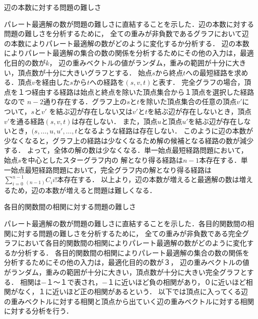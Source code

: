 \documentclass[12pt]{optlab-bachelor}
\begin{document}
\begin{description}
  \item[辺の本数に対する問題の難しさ]
\end{description}

パレート最適解の数が問題の難しさに直結することを示した．辺の本数に対する問題の難しさを分析するために，
全ての重みが非負数であるグラフにおいて辺の本数によりパレート最適解の数がどのように変化するか分析する．
辺の本数によりパレート最適解の集合の数の関係を分析するためにその他の入力は，最適化目的の数が$k$，
辺の重みベクトルの値がランダム，重みの範囲が十分に大きい，頂点数が十分に大きいグラフとする．
始点$s$から終点$t$への最短経路を求める．頂点$v$を経由した$s$から$t$への経路を$(s,v,t)$と表す．
完全グラフの場合，頂点を１つ経由する経路は始点と終点を除いた頂点集合から１頂点を選択した経路なので
$n-2$通り存在する．グラフ上の$s$と$t$を除いた頂点集合の任意の頂点$v'$について，$s$と$v'$
を結ぶ辺が存在しない又は$v'$と$t$を結ぶ辺が存在しないとき，頂点$v'$を通る経路$(s,v,t)$は存在しない．
また，頂点$u$と頂点$u'$を結ぶ辺が存在しないとき，$(s,\ldots, u, u', \ldots , t$となるような経路は存在しない．
このように辺の本数が少なくなると，グラフ上の経路は少なくなるため解の候補となる経路の数が減少する．
よって，全体の解の数は少なくなる．単一始点最短経路問題において，始点$s$を中心としたスターグラフ内の
解となり得る経路は$n-1$本存在する．単一始点最短経路問題において，完全グラフ内の解となり得る経路は
$\displaystyle \sum_{i=0}^{n-1} {}_{(n-1)}C_i i!$本存在する．
以上より，辺の本数が増えると最適解の数は増えるため，辺の本数が増えると問題は難しくなる．

\begin{description}
  \item[各目的関数間の相関に対する問題の難しさ]
\end{description}

パレート最適解の数が問題の難しさに直結することを示した．各目的関数間の相関に対する問題の難しさを分析するために，
全ての重みが非負数である完全グラフにおいて各目的関数間の相関によりパレート最適解の数がどのように変化するか分析する．
各目的関数間の相関によりパレート最適解の集合の数の関係を分析するためにその他の入力は，最適化目的の数が３，
辺の重みベクトルの値がランダム，重みの範囲が十分に大きい，頂点数が十分に大きい完全グラフとする．
相関は−１〜１で表され，−１に近いほど負の相関があり，０に近いほど相関がなく，１に近いほど正の相関があるという．
以下では頂点に入ってくる辺の重みベクトルに対する相関と頂点から出ていく辺の重みベクトルに対する相関に対する分析を行う．
\end{document}
